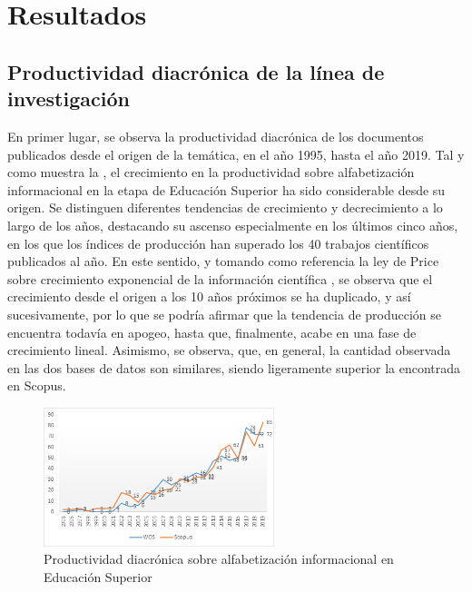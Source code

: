 \documentclass[spanish]{textolivre}
\begin{document}
\section{Resultados}
\subsection{Productividad diacrónica de la línea de investigación}
En primer lugar, se observa la productividad diacrónica de los documentos publicados desde el origen de la temática, en el año 1995, hasta el año 2019. Tal y como muestra la , el crecimiento en la productividad sobre alfabetización informacional en la etapa de Educación Superior ha sido considerable desde su origen. Se distinguen diferentes tendencias de crecimiento y decrecimiento a lo largo de los años, destacando su ascenso especialmente en los últimos cinco años, en los que los índices de producción han superado los 40 trabajos científicos publicados al año.  En este sentido, y tomando como referencia la ley de Price sobre crecimiento exponencial de la información científica \cite{price1986}, %
se observa que el crecimiento desde el origen a los 10 años próximos se ha duplicado, y así sucesivamente, por lo que se podría afirmar que la tendencia de producción se encuentra todavía en apogeo, hasta que, finalmente, acabe en una fase de crecimiento lineal. Asimismo, se observa, que, en general, la cantidad observada en las dos bases de datos son similares, siendo ligeramente superior la encontrada en Scopus.

\begin{figure}[htbp]
 \centering
 \includegraphics[width=0.6\textwidth]{fig2.png}
 \caption{Productividad diacrónica sobre alfabetización informacional en Educación Superior}
 \label{fig2}
\end{figure}
\end{document}
